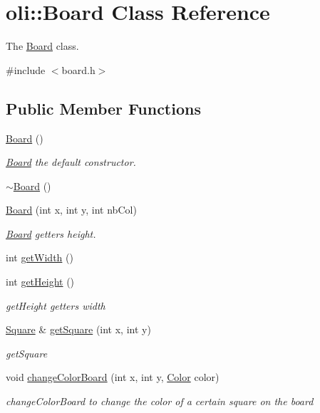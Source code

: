\hypertarget{classoli_1_1_board}{}\section{oli\+:\+:Board Class Reference}
\label{classoli_1_1_board}


The \hyperlink{classoli_1_1_board}{Board} class.  




{\ttfamily \#include $<$board.\+h$>$}

\subsection*{Public Member Functions}
\begin{DoxyCompactItemize}
\item 
\hyperlink{classoli_1_1_board_a20734da03f3278f4160713deee5ea08e}{Board} ()
\begin{DoxyCompactList}\small\item\em \hyperlink{classoli_1_1_board}{Board} the default constructor. \end{DoxyCompactList}\item 
\hyperlink{classoli_1_1_board_af768f5fed76ddda7696e73657ad0fadf}{$\sim$\+Board} ()
\item 
\hyperlink{classoli_1_1_board_a59f9bae0c95aa7a3ff1761db02437143}{Board} (int x, int y, int nb\+Col)
\begin{DoxyCompactList}\small\item\em \hyperlink{classoli_1_1_board}{Board} getters height. \end{DoxyCompactList}\item 
int \hyperlink{classoli_1_1_board_a228d72d2aa8a9df2f545ecef14e72a0d}{get\+Width} ()
\item 
int \hyperlink{classoli_1_1_board_a17dce7dacfe888f52dfad0468ae51ace}{get\+Height} ()
\begin{DoxyCompactList}\small\item\em get\+Height getters width \end{DoxyCompactList}\item 
\hyperlink{classoli_1_1_square}{Square} \& \hyperlink{classoli_1_1_board_a5c1ce624776b1169ee16d8d815e9a453}{get\+Square} (int x, int y)
\begin{DoxyCompactList}\small\item\em get\+Square \end{DoxyCompactList}\item 
void \hyperlink{classoli_1_1_board_a8c5091c12a29718d580db501f09592c8}{change\+Color\+Board} (int x, int y, \hyperlink{namespaceoli_aac44697e43b3ab2ad32fe892ab2276eb}{Color} color)
\begin{DoxyCompactList}\small\item\em change\+Color\+Board to change the color of a certain square on the board \end{DoxyCompactList}\end{DoxyCompactItemize}


